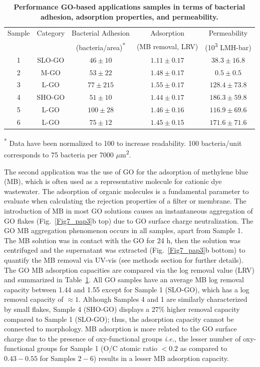 \begin{table}[t!]
 \caption{\textbf{Performance GO-based applications samples in terms of bacterial adhesion, adsorption properties, and permeability.}}
  \label{tbl3_pap3}
  \begin{tabular}{ccccc}
        \hline
        Sample & Category & Bacterial Adhesion & Adsorption &  Permeability\\
        & & (bacteria/area)\textsuperscript{*} & (MB removal, LRV)& (10\textsuperscript{3} LMH-bar)\\
        \hline
        1 & SLO-GO & $46\pm10$  & $1.11\pm0.17$  & $38.3\pm16.8$\\
        2 & M-GO   & $53\pm22$  & $1.48\pm0.17$  & $0.5\pm0.5$\\
        3 & L-GO   & $77\pm215$  & $1.55\pm0.17$ & $128.4\pm73.8$\\
        4 & SHO-GO & $51\pm10$  & $1.44\pm0.17$  & $186.3\pm59.8$\\
        5 & L-GO   & $100\pm28$  & $1.46\pm0.16$ &  $116.9\pm69.6$\\
        6 & L-GO   & $75\pm12$   & $1.45\pm0.15$ &   $171.6\pm71.6$\\
        \hline
  \end{tabular}
      \small
      \item\textsuperscript{*} Data have been normalized to 100 to increase readability. 100 bacteria/unit corresponds to 75 bacteria per 7000 $\mu$m\textsuperscript{2}.
\end{table}
The second application was the use of GO for the adsorption of methylene blue (MB), which is often used as a representative molecule for cationic dye wastewater. The adsorption of organic molecules is a fundamental parameter to evaluate when calculating the rejection properties of a filter or membrane. The introduction of MB in most GO solutions causes an instantaneous aggregation of GO flakes (Fig.~\ref{Fig7_pap3}b  top) due to GO surface charge neutralization.\cite{yang2011removal,li2013comparative} The GO MB aggregation phenomenon occurs in all samples, apart from Sample 1. The MB solution was in contact with the GO for 24 h, then the solution was centrifuged and the supernatant was extracted (Fig.~\ref{Fig7_pap3}b  bottom) to quantify the MB removal via UV-vis (see methods section for further details). The GO MB adsorption capacities are compared via the log removal value (LRV) and summarized in Table~\ref{tbl3_pap3}. All GO samples have an average MB log removal capacity between 1.44 and 1.55 except for Sample 1 (SLO-GO), which has a log removal capacity of $\approx1$. Although Samples 4 and 1 are similarly characterized by small flakes, Sample 4 (SHO-GO) displays a 27\% higher removal capacity compared to Sample 1 (SLO-GO); thus, the adsorption capacity cannot be connected to morphology. MB adsorption is more related to the GO surface charge due to the presence of oxy-functional groups\cite{krishnamoorthy2013chemical,ramesha2011graphene} \textit{i.e.}, the lesser number of oxy-functional groups for Sample 1 (O/C atomic ratio $<0.2$ as compared to $0.43-0.55$ for Samples $2-6$) results in a lesser MB adsorption capacity.\\
